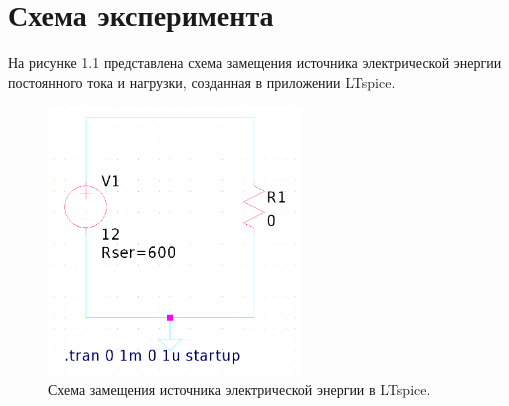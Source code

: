 \documentclass[a4paper]{article}
\begin{document}
\thispagestyle{empty}

\newpage
\pagestyle{plain}
\setcounter{page}{1}

\section{Схема эксперимента}
На рисунке 1.1 представлена схема замещения источника электрической энергии постоянного тока и нагрузки, созданная в приложении LTspice.

\begin{figure}[H]
	\centering
	\includegraphics[width=0.6\textwidth]{schema.png} %
	\caption{Схема замещения источника электрической энергии в LTspice.}
\end{figure}

\end{document}
